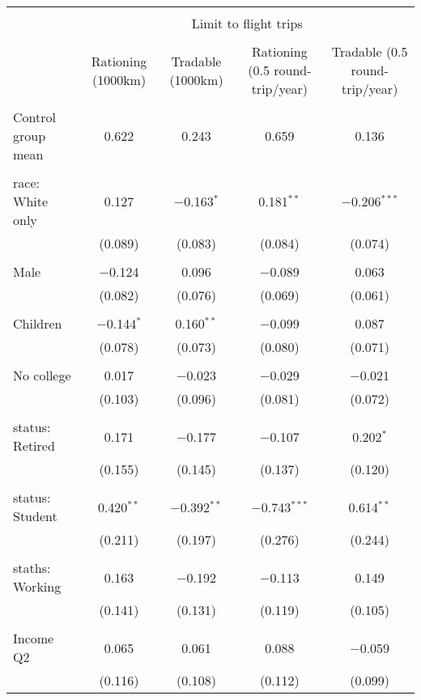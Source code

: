 
\begin{tabular}{@{\extracolsep{5pt}}lcccc} 
\\[-1.8ex]\hline 
\hline \\[-1.8ex] 
 & \multicolumn{4}{c}{Limit to flight trips} \\ 
\cline{2-5} 
\\[-1.8ex] & Rationing (1000km) & Tradable (1000km) & Rationing (0.5 round-trip/year) & Tradable (0.5 round-trip/year) \\ 
\hline \\[-1.8ex] 
 Control group mean & 0.622 & 0.243 & 0.659 & 0.136  \\ \hline \\[-1.8ex] race: White only & 0.127 & $-$0.163$^{*}$ & 0.181$^{**}$ & $-$0.206$^{***}$ \\ 
  & (0.089) & (0.083) & (0.084) & (0.074) \\ 
  & & & & \\ 
 Male & $-$0.124 & 0.096 & $-$0.089 & 0.063 \\ 
  & (0.082) & (0.076) & (0.069) & (0.061) \\ 
  & & & & \\ 
 Children & $-$0.144$^{*}$ & 0.160$^{**}$ & $-$0.099 & 0.087 \\ 
  & (0.078) & (0.073) & (0.080) & (0.071) \\ 
  & & & & \\ 
 No college & 0.017 & $-$0.023 & $-$0.029 & $-$0.021 \\ 
  & (0.103) & (0.096) & (0.081) & (0.072) \\ 
  & & & & \\ 
 status: Retired & 0.171 & $-$0.177 & $-$0.107 & 0.202$^{*}$ \\ 
  & (0.155) & (0.145) & (0.137) & (0.120) \\ 
  & & & & \\ 
 status: Student & 0.420$^{**}$ & $-$0.392$^{**}$ & $-$0.743$^{***}$ & 0.614$^{**}$ \\ 
  & (0.211) & (0.197) & (0.276) & (0.244) \\ 
  & & & & \\ 
 staths: Working & 0.163 & $-$0.192 & $-$0.113 & 0.149 \\ 
  & (0.141) & (0.131) & (0.119) & (0.105) \\ 
  & & & & \\ 
 Income Q2 & 0.065 & 0.061 & 0.088 & $-$0.059 \\ 
  & (0.116) & (0.108) & (0.112) & (0.099) \\ 

\end{tabular}
